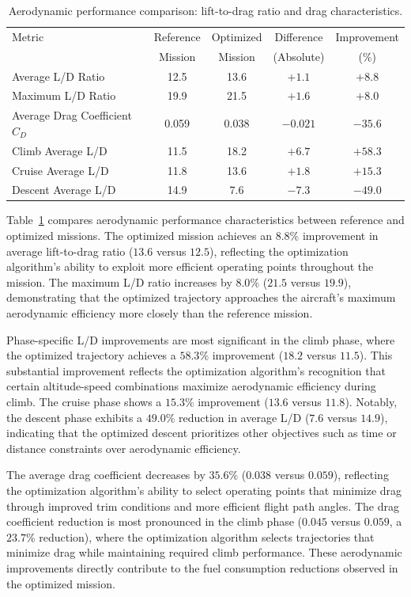 
\begin{table}[h]
    \centering
    \footnotesize
    \caption{Aerodynamic performance comparison: lift-to-drag ratio and drag characteristics.}
    \label{tab:aerodynamic_comparison}
    \begin{tabular}{l c c c c}
        \hline
        Metric & Reference & Optimized & Difference & Improvement \\
        & Mission & Mission & (Absolute) & (\%) \\
        \hline
        Average L/D Ratio & 12.5 & 13.6 & $+1.1$ & $+8.8$ \\
        Maximum L/D Ratio & 19.9 & 21.5 & $+1.6$ & $+8.0$ \\
        Average Drag Coefficient $C_D$ & 0.059 & 0.038 & $-0.021$ & $-35.6$ \\
        Climb Average L/D & 11.5 & 18.2 & $+6.7$ & $+58.3$ \\
        Cruise Average L/D & 11.8 & 13.6 & $+1.8$ & $+15.3$ \\
        Descent Average L/D & 14.9 & 7.6 & $-7.3$ & $-49.0$ \\
        \hline
    \end{tabular}
\end{table}

Table~\ref{tab:aerodynamic_comparison} compares aerodynamic performance characteristics between reference and optimized missions. The optimized mission achieves an $8.8\%$ improvement in average lift-to-drag ratio ($13.6$ versus $12.5$), reflecting the optimization algorithm's ability to exploit more efficient operating points throughout the mission. The maximum L/D ratio increases by $8.0\%$ ($21.5$ versus $19.9$), demonstrating that the optimized trajectory approaches the aircraft's maximum aerodynamic efficiency more closely than the reference mission.

Phase-specific L/D improvements are most significant in the climb phase, where the optimized trajectory achieves a $58.3\%$ improvement ($18.2$ versus $11.5$). This substantial improvement reflects the optimization algorithm's recognition that certain altitude-speed combinations maximize aerodynamic efficiency during climb. The cruise phase shows a $15.3\%$ improvement ($13.6$ versus $11.8$). Notably, the descent phase exhibits a $49.0\%$ reduction in average L/D ($7.6$ versus $14.9$), indicating that the optimized descent prioritizes other objectives such as time or distance constraints over aerodynamic efficiency.

The average drag coefficient decreases by $35.6\%$ ($0.038$ versus $0.059$), reflecting the optimization algorithm's ability to select operating points that minimize drag through improved trim conditions and more efficient flight path angles. The drag coefficient reduction is most pronounced in the climb phase ($0.045$ versus $0.059$, a $23.7\%$ reduction), where the optimization algorithm selects trajectories that minimize drag while maintaining required climb performance. These aerodynamic improvements directly contribute to the fuel consumption reductions observed in the optimized mission.
